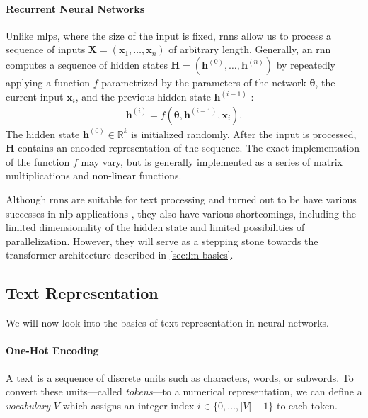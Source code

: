 \paragraph{Recurrent Neural Networks} Unlike \acp{mlp}, where the size of the input is fixed, \acp{rnn} allow us to process a sequence of inputs $\mathbf{X} = (\mathbf{x}_1, \ldots, \mathbf{x}_n)$ of arbitrary length. Generally, an \ac{rnn} computes a sequence of hidden states $\mathbf{H} = (\mathbf{h}^{(0)}, \ldots, \mathbf{h}^{(n)})$ by repeatedly applying a function $f$ parametrized by the parameters of the network $\boldsymbol{\theta}$, the current input $\mathbf{x}_i$, and the previous hidden state $\mathbf{h}^{(i-1)}$ \cite[p.~367]{goodfellow2016deep}:
\begin{align}
    \mathbf{h}^{(i)} = f(\boldsymbol{\theta}, \mathbf{h}^{(i-1)}, \mathbf{x}_i).
\end{align}
The hidden state $\mathbf{h}^{(0)} \in \mathbb{R}^k$ is initialized randomly. After the input is processed, $\mathbf{H}$ contains an encoded representation of the sequence. The exact implementation of the function $f$ may vary, but is generally implemented as a series of matrix multiplications and non-linear functions.

Although \acp{rnn} are suitable for text processing and turned out to be have various successes in \ac{nlp} applications , they also have various shortcomings, including the limited dimensionality of the hidden state and limited possibilities of parallelization. However, they will serve as a stepping stone towards the transformer architecture described in \autoref{sec:lm-basics}.


\subsection{Text Representation}
\label{sec:lm-basics}
We will now look into the basics of text representation in neural networks.


\paragraph{One-Hot Encoding}
A text is a sequence of discrete units such as characters, words, or subwords. To convert these units---called \textit{tokens}---to a numerical representation, we can define a \textit{vocabulary} $V$ which assigns an integer index $i \in \{0, \ldots, |V|-1\}$ to each token.

